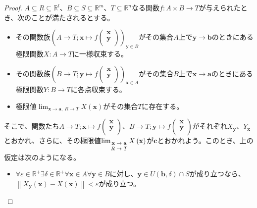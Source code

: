 \documentclass[dvipdfmx]{jsarticle}
\begin{document}
\begin{proof}
$A \subseteq R \subseteq \mathbb{R}^{l}$、$B \subseteq S \subseteq \mathbb{R}^{m}$、$T \subseteq \mathbb{R}^{n}$なる関数$f:A \times B \rightarrow T$が与えられたとき、次のことが満たされるとする。
\begin{itemize}
\item
  その関数族$\left( A \rightarrow T;\mathbf{x} \mapsto f\begin{pmatrix}
  \mathbf{x} \\
  \mathbf{y} \\
  \end{pmatrix} \right)_{\mathbf{y} \in B}$がその集合$A$上で$\mathbf{y} \rightarrow \mathbf{b}$のときにある極限関数$X:A \rightarrow T$に一様収束する。
\item
  その関数族$\left( B \rightarrow T;\mathbf{y} \mapsto f\begin{pmatrix}
  \mathbf{x} \\
  \mathbf{y} \\
  \end{pmatrix} \right)_{\mathbf{x} \in A}$がその集合$B$上で$\mathbf{x} \rightarrow \mathbf{a}$のときにある極限関数$Y:B \rightarrow T$に各点収束する。
\item
  極限値$\lim_{\mathbf{x} \rightarrow \mathbf{a} ,\  R \rightarrow T }{X\left( \mathbf{x} \right)}$がその集合$T$に存在する。
\end{itemize}
そこで、関数たち$A \rightarrow T;\mathbf{x} \mapsto f\begin{pmatrix}
\mathbf{x} \\
\mathbf{y} \\
\end{pmatrix}$、$B \rightarrow T;\mathbf{y} \mapsto f\begin{pmatrix}
\mathbf{x} \\
\mathbf{y} \\
\end{pmatrix}$がそれぞれ$X_{\mathbf{y}}$、$Y_{\mathbf{x}}$とおかれ、さらに、その極限値$\lim_{\scriptsize \begin{matrix} \mathbf{x} \rightarrow \mathbf{a} \\ R \rightarrow T \end{matrix}}{X\left( \mathbf{x} \right)}$が$\mathbf{c}$とおかれよう。このとき、上の仮定は次のようになる。
\begin{itemize}
\item
  $\forall\varepsilon \in \mathbb{R}^{+}\exists\delta \in \mathbb{R}^{+}\forall\mathbf{x} \in A\forall\mathbf{y} \in B$に対し、$\mathbf{y} \in U\left( \mathbf{b},\delta \right) \cap S$が成り立つなら、$\left\| X_{\mathbf{y}}\left( \mathbf{x} \right) - X\left( \mathbf{x} \right) \right\| < \varepsilon$が成り立つ。

\end{itemize}
\end{proof}
\end{document}
